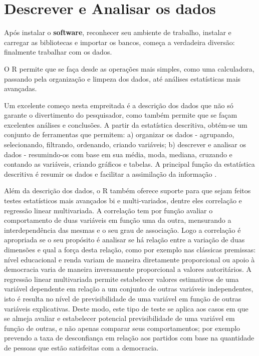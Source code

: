 \documentclass[
  brazil,
]{book}
\begin{document}
\hypertarget{descrever-e-analisar-os-dados}{%
\chapter{Descrever e Analisar os dados}\label{descrever-e-analisar-os-dados}}

Após instalar o \textbf{software}, reconhecer seu ambiente de trabalho, instalar e carregar as bibliotecas e importar os bancos, começa a verdadeira diversão: finalmente trabalhar com os dados.

O R permite que se faça desde as operações mais simples, como uma calculadora, passando pela organização e limpeza dos dados, até análises estatísticas mais avançadas.

Um excelente começo nesta empreitada é a descrição dos dados que não só garante o divertimento do pesquisador, como também permite que se façam excelentes análises e conclusões. A partir da estatística descritiva, obtém-se um conjunto de ferramentas que permitem: a) organizar os dados - agrupando, selecionando, filtrando, ordenando, criando variáveis; b) descrever e analisar os dados - resumindo-os com base em sua média, moda, mediana, cruzando e contando as variáveis, criando gráficos e tabelas. A principal função da estatística descritiva é resumir os dados e facilitar a assimilação da informação \citep{agresti_metodos_2012}.

Além da descrição dos dados, o R também oferece suporte para que sejam feitos testes estatísticos mais avançados bi e multi-variados, dentre eles correlação e regressão linear multivariada. A correlação tem por função avaliar o comportamento de duas variáveis em função uma da outra, mensurando a interdependência das mesmas e o seu grau de associação. Logo a correlação é apropriada se o seu propósito é analisar se há relação entre a variação de duas dimensões e qual a força desta relação, como por exemplo nas clássicas premissas: nível educacional e renda variam de maneira diretamente proporcional ou apoio à democracia varia de maneira inversamente proporcional a valores autoritários. A regressão linear multivariada permite estabelecer valores estimativos de uma variável dependente em relação a um conjunto de outras variáveis independentes, isto é resulta no nível de previsibilidade de uma variável em função de outras variáveis explicativas. Deste modo, este tipo de teste se aplica aos casos em que se almeja avaliar e estabelecer potencial previsibilidade de uma variável em função de outras, e não apenas comparar seus comportamentos; por exemplo prevendo a taxa de desconfiança em relação aos partidos com base na quantidade de pessoas que estão satisfeitas com a democracia.
\end{document}
